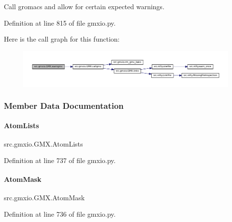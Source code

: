 Call gromacs and allow for certain expected warnings. 



Definition at line 815 of file gmxio.\+py.

Here is the call graph for this function\+:
\nopagebreak
\begin{figure}[H]
\begin{center}
\leavevmode
\includegraphics[width=350pt]{classsrc_1_1gmxio_1_1GMX_a24343e631722ec863df94641493128a9_cgraph}
\end{center}
\end{figure}


\subsubsection{Member Data Documentation}
\mbox{\label{classsrc_1_1gmxio_1_1GMX_a6d192dedcf63a9d71896f18813131ebd}} 
\paragraph{\texorpdfstring{Atom\+Lists}{AtomLists}}
{\footnotesize\ttfamily src.\+gmxio.\+G\+M\+X.\+Atom\+Lists}



Definition at line 737 of file gmxio.\+py.

\mbox{\label{classsrc_1_1gmxio_1_1GMX_a23a0c5f383f369b3d45a85f600d42757}} 
\paragraph{\texorpdfstring{Atom\+Mask}{AtomMask}}
{\footnotesize\ttfamily src.\+gmxio.\+G\+M\+X.\+Atom\+Mask}



Definition at line 736 of file gmxio.\+py.

